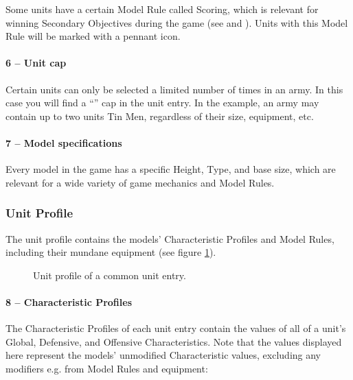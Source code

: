 Some units have a certain Model Rule called Scoring, which is relevant for winning Secondary Objectives during the game (see  and ). Units with this Model Rule will be marked with a pennant icon.

\paragraph{6 -- Unit cap}

Certain units can only be selected a limited number of times in an army. In this case you will find a \enquote{} cap in the unit entry. In the example, an army may contain up to two units Tin Men, regardless of their size, equipment, etc.

\paragraph{7 -- Model specifications}

Every model in the game has a specific Height, Type, and base size, which are relevant for a wide variety of game mechanics and Model Rules.

\subsubsection{Unit Profile}

The unit profile contains the models' Characteristic Profiles and Model Rules, including their mundane equipment (see figure \ref{figure/unit_profile}).

\newcommand{\tinmenglobalrules}{\scoring{},\strider{} (\forest{})}
\newcommand{\tinmendefrules}{\la}
\newcommand{\tinmenoffrules}{\textbf{\tinmansheart}}
\newcommand{\tinmenoffweapons}{\halberd}

\newcommand{\figTINMENProfileEight}{8 -- Characteristic Profiles}
\newcommand{\figTINMENProfileNine}{9 -- Model Rules}

\begin{figure}[H]
	\centering
	
	\caption{Unit profile of a common unit entry.}
	\label{figure/unit_profile}
\end{figure}

\paragraph{8 -- Characteristic Profiles}

The Characteristic Profiles of each unit entry contain the values of all of a unit's Global, Defensive, and Offensive Characteristics. Note that the values displayed here represent the models' unmodified Characteristic values, excluding any modifiers e.g. from Model Rules and equipment:

